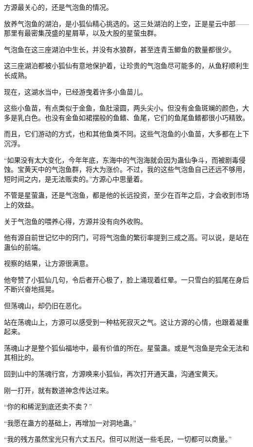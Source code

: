 
\begin{this_body}

方源最关心的，还是气泡鱼的情况。

放养气泡鱼的湖泊，是小狐仙精心挑选的。这三处湖泊的上空，正是星云中部——那里有最密集茂盛的星屑草，以及大股的星萤虫群。

气泡鱼在这三座湖泊中生长，并没有水狼群，甚至连青玉鲫鱼的数量都很少。

这三座湖泊都被小狐仙有意地保护着，让珍贵的气泡鱼尽可能多的，从鱼籽顺利生长成熟。

现在，这湖水当中，已经游曳着许多小鱼苗儿。

这些小鱼苗，有点类似于金鱼，鱼肚滚圆，两头尖小。但没有金鱼斑斓的颜色，大多是乳白色。也没有金鱼如裙摆般的鱼鳍、鱼尾，它们的鱼尾鱼鳍都很小巧精致。

而且，它们游动的方式，也和其他鱼类不同。这些气泡鱼的小鱼苗，大多都在上下沉浮。

“如果没有太大变化，今年年底，东海中的气泡海就会因为蛊仙争斗，而被剧毒侵蚀。宝黄天中的气泡鱼群，将大为涨价。不过，我的这些气泡鱼自己还远不够用，短时间之内，是无法贩卖的。”方源心中思量着。

不管是星萤蛊，还是气泡鱼，都是他的长远投资，至少在百年之后，才会收到市场上的效益。

关于气泡鱼的喂养心得，方源并没有向外收购。

他有源自前世记忆中的窍门，可将气泡鱼的繁衍率提到三成之高。可以说，是站在蛊仙的前端。

视察的结果，让方源很满意。

他夸赞了小狐仙几句，令后者开心极了，脸上涌现着红晕。一只雪白的狐尾在身后不断兴奋地摇晃。

但荡魂山，却仍旧在恶化。

站在荡魂山上，方源可以感受到一种枯死寂灭之气。这让方源的心情，也跟着凝重起来。

荡魂山才是整个狐仙福地中，最有价值的所在。星萤蛊。或是气泡鱼是完全无法和其相比的。

回到山中的荡魂行宫，方源唤来小狐仙，再次打开通天蛊，沟通宝黄天。

刚一打开，就有数道神念传达过来。

“你的和稀泥到底还卖不卖？”

“我愿在蛊方的基础上，再增加一对洞地蛊。”

“我的残方虽然宝光只有六丈五尺。但可以附送一些毛民，一切都可以商量。”


\end{this_body}
